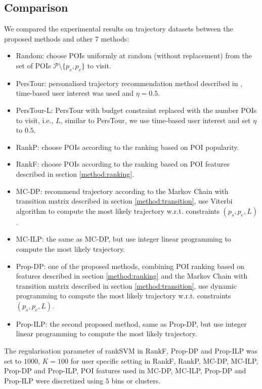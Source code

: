 \subsection{Comparison}
\label{experiment:comparison}

We compared the experimental results on trajectory datasets between the proposed methods and other 7 methods:
\begin{itemize}
\item Random: choose POIs uniformly at random (without replacement) from the set of POIs $\mathcal{P} \setminus \{p_s, p_e \}$ to visit.
\item PersTour\cite{ijcai15}: personalised trajectory recommendation method described in \cite{ijcai15}, 
      time-based user interest was used and $\eta = 0.5$.
\item PersTour-L: PersTour\cite{ijcai15} with budget constraint replaced with the number POIs to visit, i.e., $L$,
      similar to PersTour, we use time-based user interest and set $\eta$ to $0.5$.
\item RankP: choose POIs according to the ranking based on POI popularity.
\item RankF: choose POIs according to the ranking based on POI features described in section \ref{method:ranking}.
\item MC-DP: recommend trajectory according to the Markov Chain with transition matrix described in section \ref{method:transition},
      use Viterbi algorithm to compute the most likely trajectory w.r.t. constraints $(p_s, p_e, L)$.
\item MC-ILP: the same as MC-DP, but use integer linear programming to compute the most likely trajectory.
\item Prop-DP: one of the proposed methods, combining POI ranking based on features 
      described in section \ref{method:ranking} and the Markov Chain with transition matrix described in section \ref{method:transition},
      use dynamic programming to compute the most likely trajectory w.r.t. constraints $(p_s, p_e, L)$.
\item Prop-ILP: the second proposed method, same as Prop-DP,
      but use integer linear programming to compute the most likely trajectory.
\end{itemize}

The regularisation parameter of rankSVM in RankF, Prop-DP and Prop-ILP was set to $1000$,
$K=100$ for user specific setting in RankF, RankP, MC-DP, MC-ILP, Prop-DP and Prop-ILP,
POI features used in MC-DP, MC-ILP, Prop-DP and Prop-ILP were discretized using $5$ bins or clusters.


